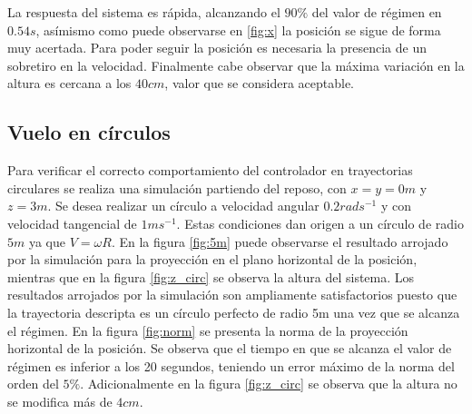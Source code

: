 \documentclass[main]{subfiles}
\begin{document}
La respuesta del sistema es r\'apida, alcanzando el $90\%$ del valor de r\'egimen en $0.54s$, as\'imismo como puede observarse en \ref{fig:x} la posici\'on se sigue de forma muy acertada.  Para poder seguir la posici\'on es necesaria la presencia de un sobretiro en la velocidad. Finalmente cabe observar que la m\'axima variaci\'on en la altura es cercana a los $40cm$, valor que se considera aceptable.

%
%

\subsection{Vuelo en c\'irculos}
Para verificar el correcto comportamiento del controlador en trayectorias circulares se realiza una simulaci\'on partiendo del reposo, con $x =y = 0m$ y $z=3m$. Se desea realizar un c\'irculo a velocidad angular $0.2rads^{-1}$ y con velocidad tangencial de $1ms^{-1}$. Estas condiciones dan origen a un c\'irculo de radio $5m$ ya que $V = \omega R$. En la figura \ref{fig:5m} puede observarse el resultado arrojado por la simulaci\'on para la proyecci\'on en el plano horizontal de la posici\'on, mientras que en la figura \ref{fig:z_circ} se observa la altura del sistema. Los resultados arrojados por la simulaci\'on son ampliamente satisfactorios puesto que la trayectoria descripta es un c\'irculo perfecto de radio 5m una vez que se alcanza el r\'egimen. En la figura \ref{fig:norm} se presenta la norma de la proyecci\'on horizontal de la posici\'on. Se observa que el tiempo en que se alcanza el valor de r\'egimen es inferior a los 20 segundos, teniendo un error m\'aximo de la norma del orden del $5\%$. Adicionalmente en la figura \ref{fig:z_circ} se observa que la altura no se modifica m\'as de $4cm$.\\
 
\end{document}
